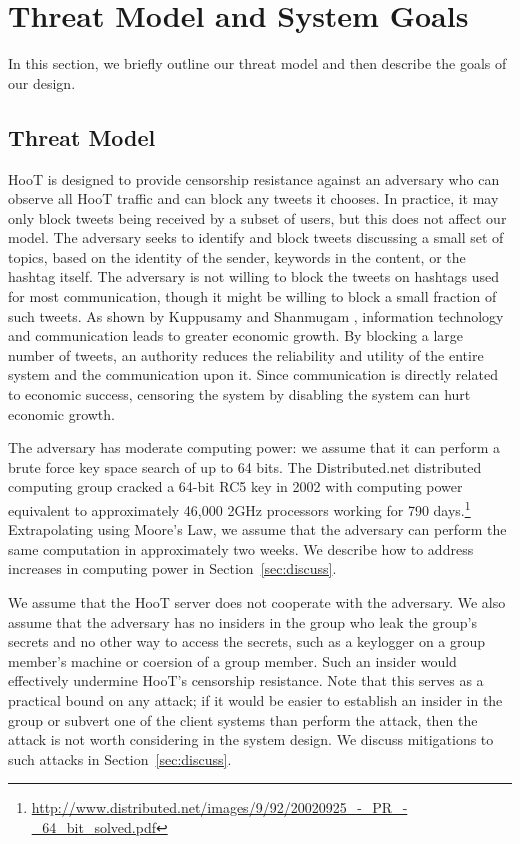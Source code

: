\section{Threat Model and System Goals}

In this section, we briefly outline our threat model and then describe
the goals of our design.

\subsection{Threat Model} \label{sec:threat}
HooT is designed to provide censorship resistance against an adversary
who can observe all HooT traffic and can block any tweets it chooses. In
practice, it may only block tweets being received by a subset of users,
but this does not affect our model. The adversary seeks to identify and
block tweets discussing a small set of topics, based on the identity of
the sender, keywords in the content, or the hashtag itself. The
adversary is not willing to block the tweets on hashtags used for most
communication, though it might be willing to block a small fraction of
such tweets. As shown by Kuppusamy and Shanmugam \cite{ict-economy}, information technology 
and communication leads to greater economic growth. By blocking a large
number of tweets, an authority reduces the reliability and utility of 
the entire \hoot system and the communication upon it. Since communication is directly related to economic
success, censoring the system by disabling the system can hurt economic growth.


The adversary has moderate computing power: we assume that it can
perform a brute force key space search of up to 64 bits. The
Distributed.net distributed computing group cracked a 64-bit RC5 key in
2002 with computing power equivalent to approximately 46,000 2GHz
processors working for 790
days.\footnote{\url{http://www.distributed.net/images/9/92/20020925_-_PR_-_64_bit_solved.pdf}}
Extrapolating using Moore's Law, we assume that the adversary can
perform the same computation in approximately two weeks. We describe how
to address increases in computing power in Section~\ref{sec:discuss}.

We assume that the HooT server does not cooperate with the adversary. We
also assume that the adversary has no insiders in the group who leak the
group's secrets and no other way to access the secrets, such as a
keylogger on a group member's machine or coersion of a group
member. Such an insider would effectively undermine HooT's censorship
resistance. Note that this serves as a practical bound on any attack; if
it would be easier to establish an insider in the group or subvert one
of the client systems than perform the attack, then the attack is not
worth considering in the system design. We discuss mitigations to such
attacks in Section~\ref{sec:discuss}.

